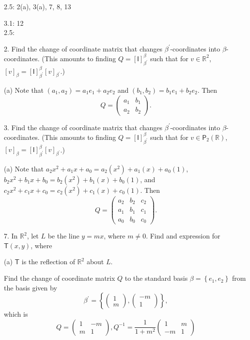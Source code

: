 \documentclass[11pt]{article}
\newcommand{\sbr}[1]{\left[#1\right]}
\newcommand{\cbr}[1]{\left\{#1\right\}}
\begin{document}
2.5: 2(a), 3(a), 7, 8, 13

3.1: 12 \\

2.5:

2. Find the change of coordinate matrix that changes $\beta^{\prime}$-coordinates into $\beta$-coordinates. (This amounts to finding $Q = \sbr{\mathsf{I}}_{\beta^{\prime}}^{\beta}$ such that for $v\in\mathbb{R}^2$, $\sbr{v}_{\beta} = \sbr{\mathsf{I}}_{\beta^{\prime}}^{\beta}\sbr{v}_{\beta^{\prime}}$.)

(a) Note that $(a_1,a_2) = a_1e_1 + a_2e_2$ and $(b_1,b_2) = b_1e_1+b_2e_2$. Then $$Q = \begin{pmatrix}
    a_1 & b_1 \\
    a_2 & b_2
\end{pmatrix}.$$

3. Find the change of coordinate matrix that changes $\beta^{\prime}$-coordinates into $\beta$-coordinates. (This amounts to finding $Q = \sbr{\mathsf{I}}_{\beta^{\prime}}^{\beta}$ such that for $v\in\mathsf{P}_2(\mathbb{R})$, $\sbr{v}_{\beta} = \sbr{\mathsf{I}}_{\beta^{\prime}}^{\beta}\sbr{v}_{\beta^{\prime}}$.)

(a) Note that $a_2x^2+a_1x+a_0 = a_2(x^2)+a_1(x)+a_0(1)$, $b_2x^2+b_1x+b_0 = b_2(x^2)+b_1(x)+b_0(1)$, and $c_2x^2+c_1x+c_0 = c_2(x^2)+c_1(x)+c_0(1)$. Then $$Q = \begin{pmatrix}
    a_2 & b_2 & c_2 \\
    a_1 & b_1 & c_1 \\
    a_0 & b_0 & c_0
\end{pmatrix}.$$

7. In $\mathbb{R}^2$, let $L$ be the line $y=mx$, where $m\neq 0$. Find and expression for $\mathsf{T}(x,y)$, where

(a) $\mathsf{T}$ is the reflection of $\mathbb{R}^2$ about $L$.

Find the change of coordinate matrix $Q$ to the standard basis $\beta = \cbr{e_1,e_2}$ from the basis given by $$\beta^{\prime} = \cbr{\begin{pmatrix} 1 \\ m \end{pmatrix}, \begin{pmatrix} -m \\ 1 \end{pmatrix}},$$ which is $$Q = \begin{pmatrix}
    1 & -m \\
    m & 1
\end{pmatrix}, Q^{-1} = \frac{1}{1+m^2}\begin{pmatrix}
    1 & m \\
    -m & 1
\end{pmatrix}$$
\end{document}

